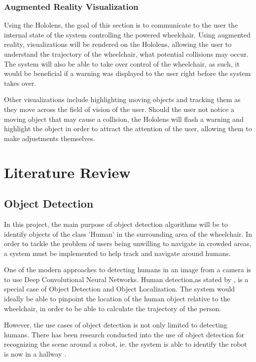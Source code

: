 \documentclass[12pt,a4paper]{report}
\begin{document}
\subsection{Augmented Reality Visualization}
Using the Hololens, the goal of this section is to communicate to the user the internal state of the system controlling the powered wheelchair. Using augmented reality, visualizations will be rendered on the Hololens, allowing the user to understand the trajectory of the wheelchair, what potential collisions may occur. The system will also be able to take over control of the wheelchair, as such, it would be beneficial if a warning was displayed to the user right before the system takes over.

Other visualizations include highlighting moving objects and tracking them as they move across the field of vision of the user. Should the user not notice a moving object that may cause a collision, the Hololens will flash a warning and highlight the object in order to attract the attention of the user, allowing them to make adjustments themselves.

\newpage

\chapter{Literature Review}

\section{Object Detection}
In this project, the main purpose of object detection algorithms will be to identify objects of the class 'Human' in the surrounding area of the wheelchair. In order to tackle the problem of users being unwilling to navigate in crowded areas, a system must be implemented to help track and navigate around humans.

One of the modern approaches to detecting humans in an image from a camera is to use Deep Convolutional Neural Networks. Human detection,as stated by \cite{Vidanapathirana}, is a special case of Object Detection and Object Localization. The system would ideally be able to pinpoint the location of the human object relative to the wheelchair, in order to be able to calculate the trajectory of the person.

However, the use cases of object detection is not only limited to detecting humans. There has been research conducted into the use of object detection for recognizing the scene around a robot, ie. the system is able to identify the robot is now in a hallway \citep{Quattoni2009, Espinace2010}.
\end{document}
